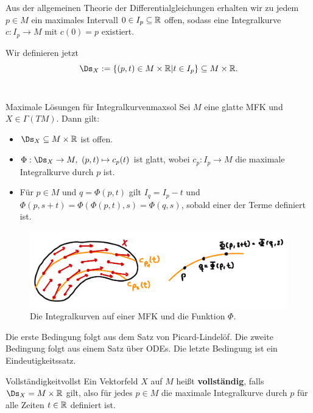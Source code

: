 \begin{bemerkung}
Aus der allgemeinen Theorie der Differentialgleichungen erhalten wir zu jedem $p \in M$ ein maximales Intervall $0 \in I_p \subseteq \mathbb{R}$ offen, sodass eine Integralkurve $c: I_p \to M$ mit $c(0) =p$ existiert.
\end{bemerkung}
Wir definieren jetzt 
\begin{equation}
\Ds_X := \{ (p,t) \in M \times \R | t \in I_p \} \sub M \times \R.
\end{equation}\\
\begin{satz}{Maximale Lösungen für Integralkurven}{maxsol}
Sei $M$ eine glatte MFK und $X \in \Gamma (TM)$. Dann gilt:
\begin{itemize}
\item $\Ds_X \sub M \times \R$ ist offen.
\item $\Phi: \Ds_X \to M, \ (p,t) \mapsto c_p(t)$ ist glatt, wobei $c_p: I_p \to M$ die maximale Integralkurve durch $p$ ist.
\item Für $p \in M$ und $q = \Phi (p,t)$ gilt $I_q = I_p -t$ und $\Phi(p, s+t) = \Phi(\Phi(p,t), s) = \Phi(q, s)$, sobald einer der Terme definiert ist.
\end{itemize}
\begin{figure}[H]
\label{fig:maxlsg}
\centering
\includegraphics[width=0.5\linewidth]{Bilder/maxlsg.png}
\caption{Die Integralkurven auf einer MFK und die Funktion $\Phi$.}
\end{figure}
\end{satz}
\begin{beweis}
Die erste Bedingung folgt aus dem Satz von Picard-Lindelöf. Die zweite Bedingung folgt aus einem Satz über ODEs. Die letzte Bedingung ist ein Eindeutigkeitssatz.
\end{beweis}
\begin{definition}{Vollständigkeit}{vollst}
Ein Vektorfeld $X$ auf $M$ heißt \textbf{vollständig}, falls $\Ds_X = M \times \R$ gilt, also für jedes $p \in M$ die maximale Integralkurve durch $p$ für alle Zeiten $t \in \mathbb{R}$ definiert ist.
\end{definition}
